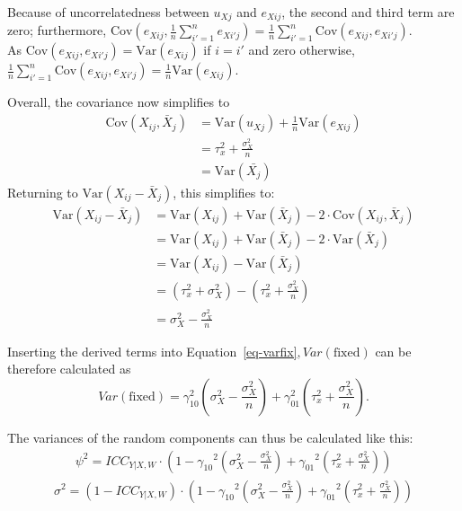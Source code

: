 \documentclass[
  letterpaper,
  11pt,
  english,
  singlespacing,
  headsepline,
  openany]{MastersDoctoralThesis}
\begin{document}
Because of uncorrelatedness between \(u_{Xj}\) and \(e_{Xij}\), the
second and third term are zero; furthermore,
\(\mathrm{Cov}\left(e_{Xij}, \frac{1}{n} \sum_{i'=1}^{n} e_{Xi'j}\right)  = \frac{1}{n} \sum_{i'=1}^{n} \mathrm{Cov}(e_{Xij}, e_{Xi'j})\).\\
As \(\mathrm{Cov}(e_{Xij}, e_{Xi'j}) = \mathrm{Var}(e_{Xij})\) if
\(i=i'\) and zero otherwise,
\(\frac{1}{n} \sum_{i'=1}^{n} \mathrm{Cov}(e_{Xij}, e_{Xi'j}) = \frac{1}{n}\mathrm{Var}(e_{Xij})\).

Overall, the covariance now simplifies to \[
\begin{aligned}
\mathrm{Cov}(X_{ij}, \bar{X}_{j})
&= \mathrm{Var}(u_{Xj}) + \frac{1}{n}\mathrm{Var}(e_{Xij})\\
&= \tau_x^2 + \frac{\sigma_X^2}{n}\\
&= \mathrm{Var}(\bar{X_j})
\end{aligned}
\] Returning to \(\mathrm{Var}(X_{ij} - \bar{X}_{j})\), this simplifies
to: \[
\begin{aligned}
\mathrm{Var}(X_{ij} - \bar{X}_{j})
&= \mathrm{Var}(X_{ij}) + \mathrm{Var}(\bar{X}_{j}) - 2 \cdot \mathrm{Cov}(X_{ij}, \bar{X}_{j})\\
&= \mathrm{Var}(X_{ij}) + \mathrm{Var}(\bar{X}_{j}) - 2 \cdot \mathrm{Var}(\bar{X}_{j})\\
&= \mathrm{Var}(X_{ij}) - \mathrm{Var}(\bar{X}_{j})\\
&= (\tau_x^2 + \sigma_X^2) -(\tau_x^2 + \frac{\sigma_X^2}{n})\\
&= \sigma_X^2 -\frac{\sigma_X^2}{n}
\end{aligned}
\]

Inserting the derived terms into
Equation~\ref{eq-varfix}\(, Var(\text{fixed})\) can be therefore
calculated as \[
Var(\text{fixed})
= \gamma_{10}^2 \left(\sigma_X^2 - \frac{\sigma_X^2}{n}\right)
+ \gamma_{01}^2 \left(\tau_x^2 + \frac{\sigma_X^2}{n}\right).
\]

The variances of the random components can thus be calculated like this:
\[ 
\begin{aligned}
\psi^2 = ICC_{Y|X,W} \cdot (1-{{\gamma_{10}}^2(\sigma_X^2- \frac{\sigma_X^2}{n})+{\gamma_{01}}^2(\tau_x^2+\frac{\sigma_X^2 }{n}) } ) 
\end{aligned}
\] \[
\begin{aligned}
\sigma^2 = (1 - ICC_{Y|X,W}) \cdot (1-{{\gamma_{10}}^2(\sigma_X^2- \frac{\sigma_X^2 }{n})+{\gamma_{01}}^2(\tau_x^2+\frac{\sigma_X^2 }{n}) } )
\end{aligned}
\]
\end{document}
